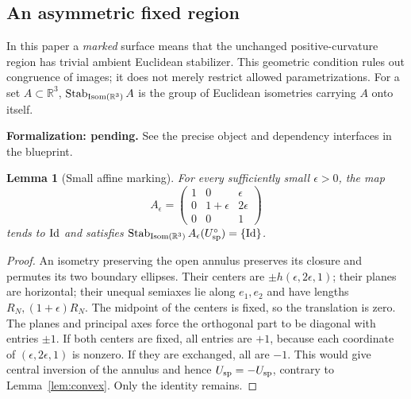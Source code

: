 \documentclass[11pt]{amsart}
\newtheorem{lemma}[theorem]{Lemma}
\theoremstyle{definition}
\theoremstyle{remark}
\newcommand{\R}{\mathbb R}\newcommand{\Sph}{\mathbb S}
\DeclareMathOperator{\Isom}{Isom}\DeclareMathOperator{\Emb}{Emb}
\numberwithin{equation}{section}
\begin{document}
\subsection{An asymmetric fixed region}
In this paper a \emph{marked} surface means that the unchanged
positive-curvature region has trivial ambient Euclidean stabilizer.
This geometric condition rules out congruence of images; it does not
merely restrict allowed parametrizations. For a set $A\subset\R^3$,
$\Stab_{\Isom(\R^3)}A$ is the group of Euclidean isometries carrying
$A$ onto itself.

\par\noindent\textbf{Formalization: pending.} See the precise object and dependency interfaces in the blueprint.\par
\begin{lemma}[Small affine marking]\label{lem:ellipses-new}
For every sufficiently small $\epsilon>0$, the map
\[
 A_\epsilon=\begin{pmatrix}
 1&0&\epsilon\\0&1+\epsilon&2\epsilon\\0&0&1
 \end{pmatrix}
\]
tends to $\mathrm{Id}$ and satisfies
$\Stab_{\Isom(\R^3)}A_\epsilon(U_{\rm sp}^\circ)=\{\Id\}$.
\end{lemma}
\begin{proof}
An isometry preserving the open annulus preserves its closure and permutes
its two boundary ellipses. Their centers are
$\pm h(\epsilon,2\epsilon,1)$; their planes are horizontal; their unequal
semiaxes lie along $e_1,e_2$ and have lengths $R_N,(1+\epsilon)R_N$.
The midpoint of the centers is fixed, so the translation is zero.
The planes and principal axes force the orthogonal part to be diagonal
with entries $\pm1$. If both centers are fixed, all entries are $+1$,
because each coordinate of $(\epsilon,2\epsilon,1)$ is nonzero.
If they are exchanged, all are $-1$. This would give central inversion
of the annulus and hence $U_{\rm sp}=-U_{\rm sp}$, contrary to
Lemma~\ref{lem:convex}. Only the identity remains.
\end{proof}
\end{document}
